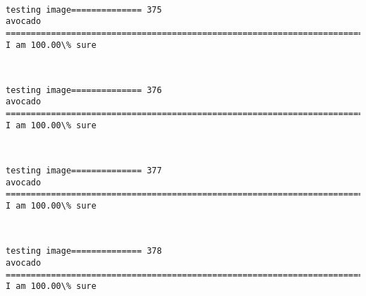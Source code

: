 \documentclass[11pt]{article}
\begin{document}
    \begin{center}
    \end{center}
    { \hspace*{\fill} \\}
    
    \begin{Verbatim}[commandchars=\\\{\}]
testing image============== 375
avocado
============================================================================
I am 100.00\% sure

    \end{Verbatim}

    \begin{center}
    \end{center}
    { \hspace*{\fill} \\}
    
    \begin{Verbatim}[commandchars=\\\{\}]
testing image============== 376
avocado
============================================================================
I am 100.00\% sure

    \end{Verbatim}

    \begin{center}
    \end{center}
    { \hspace*{\fill} \\}
    
    \begin{Verbatim}[commandchars=\\\{\}]
testing image============== 377
avocado
============================================================================
I am 100.00\% sure

    \end{Verbatim}

    \begin{center}
    \end{center}
    { \hspace*{\fill} \\}
    
    \begin{Verbatim}[commandchars=\\\{\}]
testing image============== 378
avocado
============================================================================
I am 100.00\% sure

    \end{Verbatim}
\end{document}
